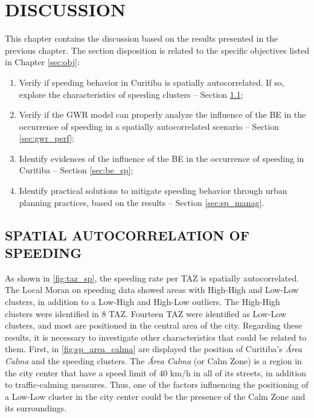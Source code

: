 \chapter{DISCUSSION} \label{chap:discussion}

This chapter contains the discussion based on the results presented in the previous chapter. The section disposition is related to the specific objectives listed in Chapter \ref{sec:obj}:

\begin{enumerate}
    \item Verify if speeding behavior in Curitiba is spatially autocorrelated. If so, explore the characteristics of speeding clusters – Section \ref{sec:sp_corr};
    \item Verify if the GWR model can properly analyze the influence of the BE in the occurrence of speeding in a spatially autocorrelated scenario – Section \ref{sec:gwr_perf};
    \item Identify evidences of the influence of the BE in the occurrence of speeding in Curitiba – Section \ref{sec:be_sp};
    \item Identify practical solutions to mitigate speeding behavior through urban planning practices, based on the results – Section \ref{sec:sp_manag}.
\end{enumerate}

\section{SPATIAL AUTOCORRELATION OF SPEEDING} \label{sec:sp_corr}



As shown in \autoref{fig:taz_sp}, the speeding rate per TAZ is spatially autocorrelated. The Local Moran on speeding data showed areas with High-High and Low-Low clusters, in addition to a Low-High and High-Low outliers. The High-High clusters were identified in 8 TAZ. Fourteen TAZ were identified as Low-Low clusters, and most are positioned in the central area of the city. Regarding these results, it is necessary to investigate other characteristics that could be related to them. First, in \autoref{fig:sp_area_calma} are displayed the position of Curitiba's \textit{Área Calma} and the speeding clusters. The \textit{Área Calma} (or Calm Zone) is a region in the city center that have a speed limit of 40 km/h in all of its streets, in addition to traffic-calming measures. Thus, one of the factors influencing the positioning of a Low-Low cluster in the city center could be the presence of the Calm Zone and its surroundings. 

